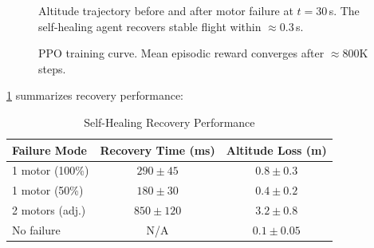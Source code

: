 \documentclass[10pt,twocolumn]{article}
\begin{document}
\begin{figure}[t]
    \centering
    \caption{Altitude trajectory before and after motor failure at
    $t=30$\,s. The self-healing agent recovers stable flight within
    ${\approx}0.3$\,s.}
    \label{fig:self_healing}
\end{figure}

\begin{figure}[t]
    \centering
    \caption{PPO training curve. Mean episodic reward converges
    after ${\approx}800$K steps.}
    \label{fig:reward_curve}
\end{figure}

\cref{tab:recovery} summarizes recovery performance:

\begin{table}[h]
\centering
\caption{Self-Healing Recovery Performance}
\label{tab:recovery}
\begin{tabular}{lcc}
\toprule
Failure Mode & Recovery Time (ms) & Altitude Loss (m) \\
\midrule
1 motor (100\%) & $290 \pm 45$  & $0.8 \pm 0.3$ \\
1 motor (50\%)  & $180 \pm 30$  & $0.4 \pm 0.2$ \\
2 motors (adj.) & $850 \pm 120$ & $3.2 \pm 0.8$ \\
No failure      & N/A           & $0.1 \pm 0.05$ \\
\bottomrule
\end{tabular}
\end{table}
\end{document}
